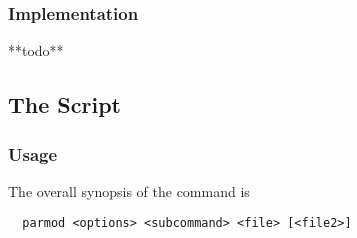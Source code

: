 \subsubsection{Implementation}

**todo**



\subsection{The  Script}
\label{impl-all-parmod}

\subsubsection{Usage}

The overall synopsis of the  command is
\begin{verbatim}
  parmod <options> <subcommand> <file> [<file2>]
\end{verbatim}

